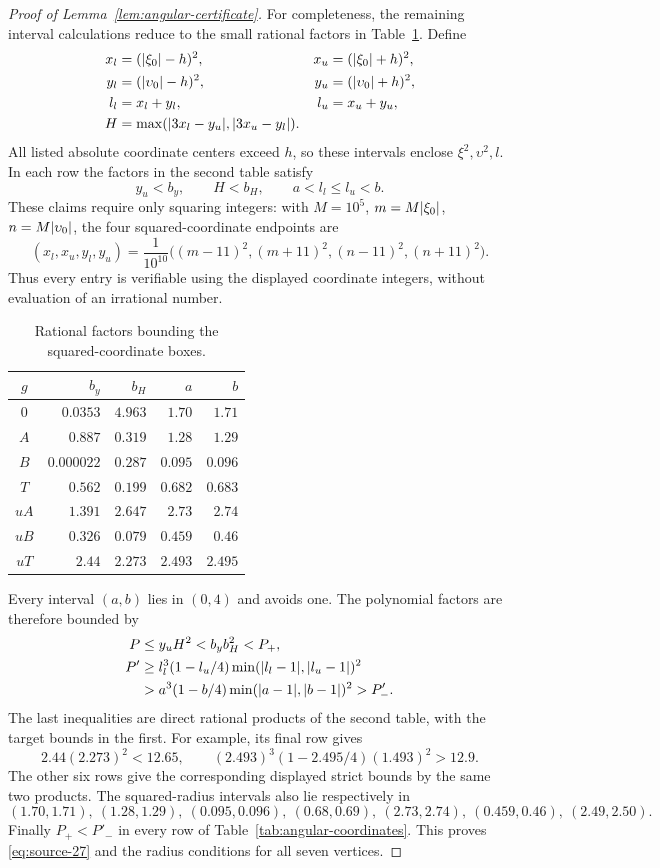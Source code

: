 \begin{proof}[Proof of Lemma~\ref{lem:angular-certificate}]
For completeness, the remaining interval calculations reduce
to the small rational factors in Table~\ref{tab:angular-factors}.
Define
\begin{align*}
 x_l&=(\lvert\xi_0\rvert-h)^2,&x_u&=(\lvert\xi_0\rvert+h)^2,\\
 y_l&=(\lvert\upsilon_0\rvert-h)^2,&y_u&=(\lvert\upsilon_0\rvert+h)^2,\\
 l_l&=x_l+y_l,&l_u&=x_u+y_u,\\
 H&=\max(\lvert3x_l-y_u\rvert,\lvert3x_u-y_l\rvert).
\end{align*}
All listed absolute coordinate centers exceed \(h\), so
these intervals enclose \(\xi^2,\upsilon^2,l\).
In each row the factors in the second table satisfy
\[
 y_u<b_y,\qquad H<b_H,\qquad a<l_l\le l_u<b.
\]
These claims require only squaring integers: with
\(M=10^5\), \(m=M\lvert\xi_0\rvert\), \(n=M\lvert\upsilon_0\rvert\),
the four squared-coordinate endpoints are
\[
 (x_l,x_u,y_l,y_u)
 =\frac1{10^{10}}
   \bigl((m-11)^2,(m+11)^2,(n-11)^2,(n+11)^2\bigr).
\]
Thus every entry is verifiable using the displayed coordinate
integers, without evaluation of an irrational number.
\begin{table}[htbp]
\centering
\begin{tabular}{@{}crrrr@{}}
\toprule
\(g\)&\(b_y\)&\(b_H\)&\(a\)&\(b\)\\
\midrule
\(0\)&\(0.0353\)&\(4.963\)&\(1.70\)&\(1.71\)\\
\(A\)&\(0.887\)&\(0.319\)&\(1.28\)&\(1.29\)\\
\(B\)&\(0.000022\)&\(0.287\)&\(0.095\)&\(0.096\)\\
\(T\)&\(0.562\)&\(0.199\)&\(0.682\)&\(0.683\)\\
\(uA\)&\(1.391\)&\(2.647\)&\(2.73\)&\(2.74\)\\
\(uB\)&\(0.326\)&\(0.079\)&\(0.459\)&\(0.46\)\\
\(uT\)&\(2.44\)&\(2.273\)&\(2.493\)&\(2.495\)\\
\bottomrule
\end{tabular}
\caption{Rational factors bounding the squared-coordinate boxes.}
\label{tab:angular-factors}
\end{table}

Every interval \((a,b)\) lies in \((0,4)\) and avoids one.
The polynomial factors are therefore bounded by
\begin{align*}
 P&\le y_u H^2<b_yb_H^2<P_+,\\
 P'&\ge l_l^3(1-l_u/4)
          \min(\lvert l_l-1\rvert,\lvert l_u-1\rvert)^2\\
   &>a^3(1-b/4)\min(\lvert a-1\rvert,\lvert b-1\rvert)^2>P'_-.
\end{align*}
The last inequalities are direct rational products of
the second table, with the target bounds in the first.
For example, its final row gives
\[
 2.44(2.273)^2<12.65,
 \qquad
 (2.493)^3(1-2.495/4)(1.493)^2>12.9.
\]
The other six rows give the corresponding displayed strict
bounds by the same two products.  The squared-radius
intervals also lie respectively in
\[
 (1.70,1.71),\ (1.28,1.29),\ (0.095,0.096),\ (0.68,0.69),
 \ (2.73,2.74),\ (0.459,0.46),\ (2.49,2.50).
\]
Finally \(P_+<P'_-\) in every row of
Table~\ref{tab:angular-coordinates}.  This proves
\eqref{eq:source-27} and the radius conditions for all seven
vertices.
\end{proof}
